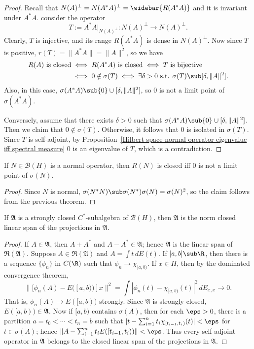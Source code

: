 \begin{proof}
Recall that $N(A)^\bot=N(A^*A)^\bot=\widebar{R(A^*A)}$ and it is invariant under $A^*A$. consider the operator
\[T:=A^*A|_{N(A)^\bot}:N(A)^\bot\to N(A)^\bot.\]
Clearly, $T$ is injective, and its range $R(A^*A)$ is dense in $N(A)^\bot$. Now since $T$ is positive, $r(T)=\|A^*A\|=\|A\|^2$, so we have
\begin{align*}
\text{$R(A)$ is closed}&\iff\text{$R(A^*A)$ is closed}\iff\text{$T$ is bijective}\\
&\iff 0\notin\sigma(T)\iff\exists\delta>0\text{ s.t. }\sigma(T)\sub[\delta,\|A\|^2].
\end{align*}
Also, in this case, $\sigma(A^*A)\sub\{0\}\cup[\delta,\|A\|^2]$, so $0$ is not a limit point of $\sigma(A^*A)$.\par
Conversely, assume that there exists $\delta>0$ such that $\sigma(A^*A)\sub\{0\}\cup[\delta,\|A\|^2]$. Then we claim that $0\notin\sigma(T)$. Otherwise, it follows that $0$ is isolated in $\sigma(T)$. Since $T$ is self-adjoint, by Proposition~\ref{Hilbert space normal operator eigenvalue iff spectral measure} $0$ is an eigenvalue of $T$, which is a contradiction.
\end{proof}
\begin{corollary}
If $N\in\mathcal{B}(H)$ is a normal operator, then $R(N)$ is closed iff $0$ is not a limit point of $\sigma(N)$.
\end{corollary}
\begin{proof}
Since $N$ is normal, $\sigma(N^*N)\sub\sigma(N^*)\sigma(N)=\sigma(N)^2$, so the claim follows from the previous theorem.
\end{proof}
\begin{proposition}\label{Hilbert space strongly closed subalgebra span of projection}
If $\mathfrak{A}$ is a strongly closed $C^*$-subalgebra of $\mathcal{B}(H)$, then $\mathfrak{A}$ is the norm closed linear span of the projections in $\mathfrak{A}$.
\end{proposition}
\begin{proof}
If $A\in\mathfrak{A}$, then $A+A^*$ and $A-A^*\in\mathfrak{A}$; hence $\mathfrak{A}$ is the linear span of $\Re(\mathfrak{A})$. Suppose $A\in\Re(\mathfrak{A})$ and $A=\int t\,dE(t)$. If $[a,b]\sub\R$, then there is a sequence $\{\phi_n\}$ in $C(\R)$ such that $\phi_n\to\chi_{[a,b)}$. If $x\in H$, then by the dominated convergence theorem,
\[\|[\phi_n(A)-E([a,b))]x\|^2=\int|\phi_n(t)-\chi_{[a,b)}(t)|^2\,dE_{x,x}\to 0.\]
That is, $\phi_n(A)\to E([a,b))$ strongly. Since $\mathfrak{A}$ is strongly closed, $E([a,b))\in\mathfrak{A}$. Now if $[a,b)$ contains $\sigma(A)$, then for each $\eps>0$, there is a partition $a=t_0<\cdots<t_n=b$ such that $|t-\sum_{i=1}^{n}t_i\chi_{[t_{i-1},t_i)}(t)|<\eps$ for $t\in\sigma(A)$; hence $\|A-\sum_{i=1}^{n}t_iE([t_{i-1},t_i))\|<\eps$. Thus every self-adjoint operator in $\mathfrak{A}$ belongs to the closed linear span of the projections in $\mathfrak{A}$.
\end{proof}
